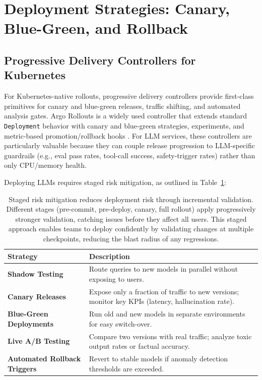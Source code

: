 \section{Deployment Strategies: Canary, Blue-Green, and Rollback}
\label{sec:cicd-deploy-strategies}
\subsection{Progressive Delivery Controllers for Kubernetes}
For Kubernetes-native rollouts, progressive delivery controllers provide first-class primitives for canary and blue-green releases, traffic shifting, and automated analysis gates. Argo Rollouts is a widely used controller that extends standard \texttt{Deployment} behavior with canary and blue-green strategies, experiments, and metric-based promotion/rollback hooks \cite{argo_rollouts_overview,argo_rollouts_canary,argo_rollouts_bluegreen}. For LLM services, these controllers are particularly valuable because they can couple release progression to LLM-specific guardrails (e.g., eval pass rates, tool-call success, safety-trigger rates) rather than only CPU/memory health.

Deploying LLMs requires staged risk mitigation, as outlined in Table~\ref{tab:ch04_deployment_risk_mitigation}:

\begin{table}[t]
\centering
\small
\caption{Staged risk mitigation reduces deployment risk through incremental validation. Different stages (pre-commit, pre-deploy, canary, full rollout) apply progressively stronger validation, catching issues before they affect all users. This staged approach enables teams to deploy confidently by validating changes at multiple checkpoints, reducing the blast radius of any regressions.}
\label{tab:ch04_deployment_risk_mitigation}
\setlength{\tabcolsep}{6pt}
\renewcommand{\arraystretch}{1.3}
\begin{tabularx}{\linewidth}{@{}p{3.5cm}X@{}}
\toprule
\rowcolor{gray!15}
\textbf{Strategy} & \textbf{Description} \\
\midrule
\textbf{Shadow Testing} & Route queries to new models in parallel without exposing to users. \\
\textbf{Canary Releases} & Expose only a fraction of traffic to new versions; monitor key KPIs (latency, hallucination rate). \\
\textbf{Blue-Green Deployments} & Run old and new models in separate environments for easy switch-over. \\
\textbf{Live A/B Testing} & Compare two versions with real traffic; analyze toxic output rates or factual accuracy. \\
\textbf{Automated Rollback Triggers} & Revert to stable models if anomaly detection thresholds are exceeded. \\
\bottomrule
\end{tabularx}
\end{table}

